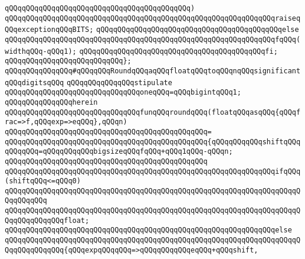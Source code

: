 \verb|qQQqqQQqqQQqqQQqqQQqqQQqqQQqqQQqqQQqqQQqqQQq)|\newline
\verb|qQQqqQQqqQQqqQQqqQQqqQQqqQQqqQQqqQQqqQQqqQQqqQQqqQQqqQQqqQQqqQQqraiseqQQqexceptionqQQqBITS;|\newline
\verb|qQQqqQQqqQQqqQQqqQQqqQQqqQQqqQQqqQQqqQQqqQQqelse|\newline
\verb|qQQqqQQqqQQqqQQqqQQqqQQqqQQqqQQqqQQqqQQqqQQqqQQqqQQqqQQqqQQqqQQqfqQQq(widthqQQq-qQQq1);|\newline
\verb|qQQqqQQqqQQqqQQqqQQqqQQqqQQqqQQqqQQqqQQqqQQqfi;|\newline
\verb|qQQqqQQqqQQqqQQqqQQqqQQqqQQq};|\newline
\newline
\verb|qQQqqQQqqQQqqQQq#qQQqqQQqRoundqQQqaqQQqfloatqQQqtoqQQqnqQQqsignificantqQQqdigitsqQQq|\newline
\newline
\verb|qQQqqQQqqQQqqQQqstipulate|\newline
\newline
\verb|qQQqqQQqqQQqqQQqqQQqqQQqqQQqqQQqoneqQQq=qQQqbigintqQQq1;|\newline
\newline
\verb|qQQqqQQqqQQqqQQqherein|\newline
\newline
\verb|qQQqqQQqqQQqqQQqqQQqqQQqqQQqqQQqfunqQQqroundqQQq(floatqQQqasqQQq{qQQqfrac=>f,qQQqexp=>eqQQq},qQQqn)|\newline
\verb|qQQqqQQqqQQqqQQqqQQqqQQqqQQqqQQqqQQqqQQqqQQqqQQq=|\newline
\verb|qQQqqQQqqQQqqQQqqQQqqQQqqQQqqQQqqQQqqQQqqQQqqQQq{qQQqqQQqqQQqshiftqQQqqQQqqQQq=qQQqqQQqqQQqbigsizeqQQqfqQQq+qQQq1qQQq-qQQqn;|\newline
\verb|qQQqqQQqqQQqqQQqqQQqqQQqqQQqqQQqqQQqqQQqqQQqqQQq|\newline
\verb|qQQqqQQqqQQqqQQqqQQqqQQqqQQqqQQqqQQqqQQqqQQqqQQqqQQqqQQqqQQqqQQqifqQQq(shiftqQQq<=qQQq0)|\newline
\verb|qQQqqQQqqQQqqQQqqQQqqQQqqQQqqQQqqQQqqQQqqQQqqQQqqQQqqQQqqQQqqQQqqQQqqQQqqQQqqQQq|\newline
\verb|qQQqqQQqqQQqqQQqqQQqqQQqqQQqqQQqqQQqqQQqqQQqqQQqqQQqqQQqqQQqqQQqqQQqqQQqqQQqqQQqqQQqfloat;|\newline
\verb|qQQqqQQqqQQqqQQqqQQqqQQqqQQqqQQqqQQqqQQqqQQqqQQqqQQqqQQqqQQqqQQqelse|\newline
\verb|qQQqqQQqqQQqqQQqqQQqqQQqqQQqqQQqqQQqqQQqqQQqqQQqqQQqqQQqqQQqqQQqqQQqqQQqqQQqqQQqqQQq{qQQqexpqQQqqQQq=>qQQqqQQqqQQqeqQQq+qQQqshift,|\newline
